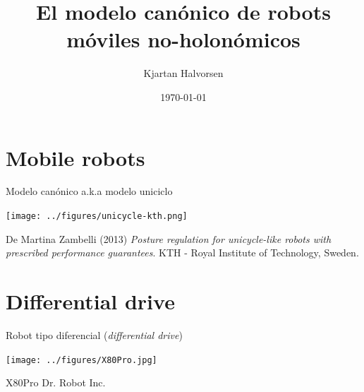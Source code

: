 \documentclass[presentation,aspectratio=169]{beamer}
\author{Kjartan Halvorsen}
\date{\today}
\title{El modelo canónico de robots móviles no-holonómicos}
\begin{document}
\maketitle

\section{Mobile robots}
\label{sec:orgfd76dd5}

\begin{frame}[label={sec:org9a51b3d}]{Modelo canónico a.k.a modelo uniciclo}
\begin{center}
 \texttt{[image: ../figures/unicycle-kth.png]}
\end{center}

\footnotesize
De Martina Zambelli (2013) \emph{Posture regulation for unicycle-like robots with prescribed performance guarantees}. KTH - Royal Institute of Technology, Sweden.
\end{frame}


\section{Differential drive}
\label{sec:org1d21ebe}

\begin{frame}[label={sec:org163cf4c}]{Robot tipo diferencial (\emph{differential drive})}
\begin{center}
 \texttt{[image: ../figures/X80Pro.jpg]}
\end{center}

X80Pro Dr. Robot Inc.
\end{frame}
\end{document}
